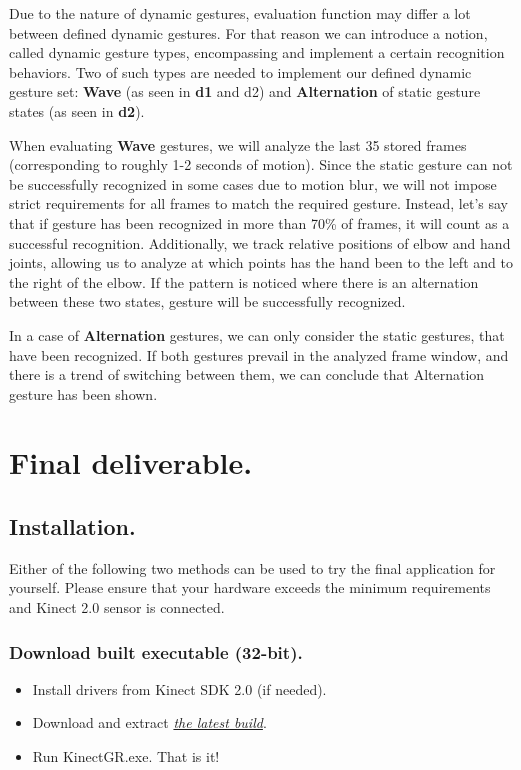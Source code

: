 \documentclass[a4paper,11pt,oneside]{article}
\begin{document}
Due to the nature of dynamic gestures, evaluation function may differ a lot between defined dynamic gestures. For that reason we can introduce a notion, called dynamic gesture types, encompassing and implement a certain recognition behaviors. Two of such types are needed to implement our defined dynamic gesture set: \textbf{Wave} (as seen in \textbf{d1} and {d2}) and \textbf{Alternation} of static gesture states (as seen in \textbf{d2}). 

When evaluating \textbf{Wave} gestures, we will analyze the last 35 stored frames (corresponding to roughly 1-2 seconds of motion). Since the static gesture can not be successfully recognized in some cases due to motion blur, we will not impose strict requirements for all frames to match the required gesture. Instead, let's say that if gesture has been recognized in more than 70\% of frames, it will count as a successful recognition. Additionally, we track relative positions of elbow and hand joints, allowing us to analyze at which points has the hand been to the left and to the right of the elbow. If the pattern is noticed where there is an alternation between these two states, gesture will be successfully recognized.

In a case of \textbf{Alternation} gestures, we can only consider the static gestures, that have been recognized. If both gestures prevail in the analyzed frame window, and there is a trend of switching between them, we can conclude that Alternation gesture has been shown.

\section{Final deliverable.}

\subsection{Installation.}

Either of the following two methods can be used to try the final application for yourself. Please ensure that your hardware exceeds the minimum requirements and Kinect 2.0 sensor is connected.

\subsubsection{Download built executable (32-bit).}

\begin{itemize}
\item Install drivers from Kinect SDK 2.0 (if needed).
\item Download and extract \href{https://github.com/dmitryfd/KinectGR/releases/download/v1.0_RC/KinectGR_v1.0_RC.zip}{\textit{the latest build}}.
\item Run KinectGR.exe. That is it!
\end{itemize}
\end{document}
